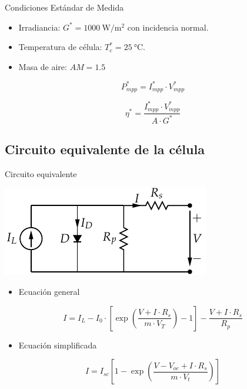 \documentclass[xcolor={usenames,svgnames,dvipsnames}]{beamer}
\begin{document}
\begin{frame}[label={sec:org48e6369}]{Condiciones Estándar de Medida}
\begin{itemize}
\item Irradiancia: \(G^{*}=\SI{1000}{\watt\per\meter\squared}\) con
incidencia normal.

\item Temperatura de célula: \(T_{c}^{*}=\SI{25}{\celsius}\).

\item Masa de aire: \(AM=1.5\)
\end{itemize}

$$P_{mpp}^{*}=I_{mpp}^{*}\cdot V_{mpp}^{*}$$

$$\eta^{*}=\frac{I_{mpp}^{*}\cdot V_{mpp}^{*}}{A\cdot G^{*}}$$
\end{frame}


\subsection{Circuito equivalente de la célula}
\label{sec:org4551117}

\begin{frame}[label={sec:org540f4a2}]{Circuito equivalente}
\begin{center}
\includegraphics[width=.9\linewidth]{../figs/ModeloElectricoCelulaSolar.pdf}
\end{center}

\begin{itemize}
\item Ecuación general
\end{itemize}

\[I=I_{L}-I_{0}\cdot[\exp(\frac{V+I\cdot R_{s}}{m\cdot
  V_{T}})-1]-\frac{V+I\cdot R_{s}}{R_{p}}\]

\begin{itemize}
\item Ecuación simplificada
\end{itemize}

$$I=I_{sc}[1-\exp(\frac{V-V_{oc}+I\cdot R_{s}}{m\cdot V_{t}})]$$
\end{frame}
\end{document}
